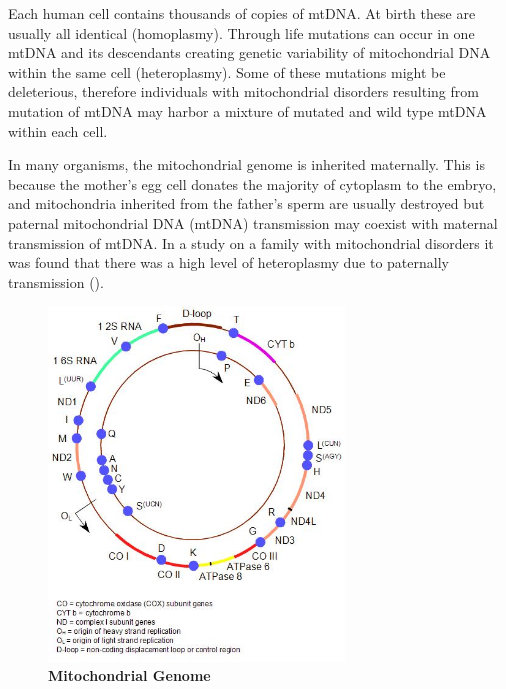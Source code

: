 Each human cell contains thousands of copies of mtDNA. At birth
these are usually all identical (homoplasmy). Through life
mutations can occur in one mtDNA and its descendants creating
genetic variability of mitochondrial DNA within the same cell
(heteroplasmy). Some of these mutations might be deleterious,
therefore individuals with mitochondrial disorders resulting from
mutation of mtDNA may harbor a mixture of mutated and wild type
mtDNA within each cell. 

In many organisms, the mitochondrial genome is inherited maternally. This is because the mother’s egg cell donates the majority of cytoplasm to the embryo, and mitochondria inherited from the father’s sperm are usually destroyed but paternal mitochondrial DNA (mtDNA) transmission may coexist with maternal transmission of mtDNA. In a study on a family with mitochondrial disorders it was found that there was a high level of heteroplasmy due to paternally transmission (\cite{luo2018biparental}). 

\begin{figure}[H]
\centering
\includegraphics[width=0.7\textwidth]{Fig/mitogenome.jpg}
\decoRule
\caption{\textbf{Mitochondrial Genome}}
\label{fig:Mitochondrial Genome}
\end{figure}

